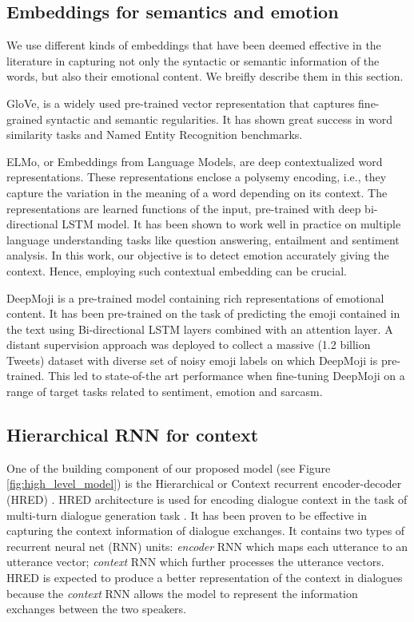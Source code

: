 \documentclass[11pt,a4paper]{article}
\begin{document}
\subsection{Embeddings for semantics and emotion}
We use different kinds of embeddings that have been deemed effective in the literature in capturing not only the syntactic or semantic information of the words, but also their emotional content. We breifly describe them in this section.

GloVe, \cite{pennington2014glove} is a widely used pre-trained vector representation that captures fine-grained syntactic and semantic regularities. It has shown great success in 
word similarity tasks and Named Entity Recognition benchmarks. 



ELMo, or Embeddings from Language Models, \cite{peters2018deep} are  deep contextualized word representations. These representations enclose a polysemy encoding, i.e., they capture the variation
in the meaning of a word 
depending on
its context.
The representations are learned functions of the input, pre-trained with deep bi-directional LSTM model.
It has been shown to work well in practice on multiple language understanding tasks like question answering, entailment and sentiment analysis.
In this work, our objective is to detect emotion accurately giving the context. Hence, employing such contextual embedding can be crucial.









DeepMoji \cite{felbo2017} is a pre-trained model containing rich representations of emotional content. It has been pre-trained on the task of predicting the emoji contained in the text using Bi-directional LSTM layers combined with an attention layer. A distant supervision approach was deployed to collect a massive (1.2 billion Tweets) dataset with diverse set of noisy emoji labels on which DeepMoji is pre-trained. 
This led to state-of-the art performance when fine-tuning DeepMoji on a range of target tasks related to sentiment, emotion and sarcasm.


\subsection{Hierarchical RNN for context}
One of the building component of our proposed model (see Figure \ref{fig:high_level_model}) is the Hierarchical or Context
recurrent encoder-decoder (HRED) \cite{sordoni2015hierarchical}. 
HRED architecture  is used for encoding dialogue context in the task of multi-turn dialogue generation task \cite{serban2016building}. It has been proven to be effective in capturing the context information of dialogue exchanges. It contains two types of recurrent neural net (RNN) units: \emph{encoder} RNN which maps each utterance to an utterance vector; \emph{context} RNN which further processes the utterance vectors. HRED is expected to 
produce a better representation of the context in  
dialogues because the \emph{context} RNN allows the model to represent the information exchanges between the two speakers.
\end{document}
